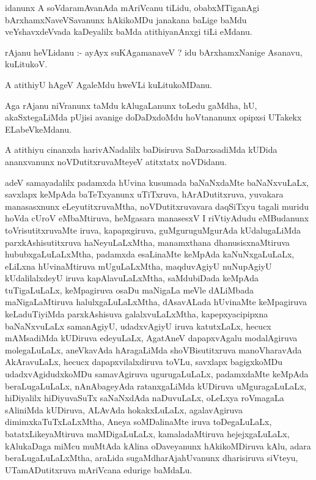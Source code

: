 \documentclass{article}
\begin{document}
\begin{mn}
idanunx  A  soVdaramAvanAda  mAriVcanu  tiLidu,  obabxMTiganAgi  bArxhamxNaveVSavanunx  hAkikoMDu  janakana  baLige  baMdu  veYshavxdeVvada  
kaDeyalilx  baMda  atithiyanAnxgi  tiLi  eMdanu.
\end{mn}

\begin{mn}
rAjanu  heVLidanu :- ayAyx  suKAgamanaveV ?  idu  bArxhamxNanige  Asanavu,  kuLitukoV.
\end{mn}

\begin{mn}
A  atithiyU  hAgeV  AgaleMdu  hweVLi  kuLitukoMDanu.
\end{mn}

\begin{mn}
Aga  rAjanu  niVranunx  taMdu  kAlugaLanunx  toLedu  gaMdha,  hU,  akaSxtegaLiMda  pUjisi  avanige  doDaDxdoMdu  hoVtananunx  
opipxsi  UTakekx  ELabeVkeMdanu.
\end{mn}

\begin{mn}
A  atithiyu  cinanxda  harivANadalilx  baDisiruva  SaDarxsadiMda  kUDida  ananxvanunx  noVDutitxruvaMteyeV  atitxtatx  noVDidanu.  
\end{mn}

\begin{mn}
adeV  samayadalilx  padamxda  hUvina  kusumada  baNaNxdaMte  baNaNxvuLaLx,  savxlapx  keMpAda  baTeTxyanunx  uTiTxruva,  hArADutitxruva,  
yuvakara  manasasxnunx  eLeyutitxruvaMtha,  noVDutitxruvavara  daqSiTxyu  tagali  muridu  hoVda  cUroV  eMbaMtiruva,  heMgasara  manasesxV  
I  riVtiyAdudu  eMBudanunx  toVrisutitxruvaMte  iruva,  kapapxgiruva,  guMguruguMgurAda  kUdalugaLiMda  parxkAshisutitxruva  haNeyuLaLxMtha,  
manamxthana  dhanusisxnaMtiruva  hububxgaLuLaLxMtha,  padamxda  esaLinaMte  keMpAda  kaNuNxgaLuLaLx,  eLiLxna  hUvinaMtiruva  mUguLaLxMtha,  
maqduvAgiyU  nuNupAgiyU  kUdalilalxdeyU  iruva  kapAlavuLaLxMtha,  saMdubiDada  keMpAda  tuTigaLuLaLx,  keMpagiruva  osaDu  maNigaLa  meVle  
dALiMbada  maNigaLaMtiruva  halulxgaLuLaLxMtha,  dAsavALada  hUvinaMte  keMpagiruva  keLaduTiyiMda  parxkAshisuva  galalxvuLaLxMtha,  
kapepxyacipipxna  baNaNxvuLaLx  samanAgiyU,  udadxvAgiyU  iruva  katutxLaLx,  hecucx  mAMsadiMda  kUDiruva  edeyuLaLx,  AgatAneV  dapapxvAgalu  
modalAgiruva  molegaLuLaLx,  aneVkavAda  hAragaLiMda  shoVBisutitxruva  manoVharavAda  AkAravuLaLx,  hecucx  dapapxvilalxdiruva  toVLu,  savxlapx  
bagigxkoMDu  udadxvAgidudxkoMDu  samavAgiruva  ugurugaLuLaLx,  padamxdaMte  keMpAda  beraLugaLuLaLx,  nAnAbageyAda  ratanxgaLiMda  kUDiruva  
uMguragaLuLaLx,  hiDiyalilx  hiDiyuvaSuTx  saNaNxdAda  naDuvuLaLx,  oLeLxya  roVmagaLa  sAliniMda  kUDiruva,  ALAvAda  hokakxLuLaLx,  agalavAgiruva  
dimimxkaTuTxLaLxMtha,  Aneya  soMDalinaMte  iruva  toDegaLuLaLx,  batatxLikeyaMtiruva  maMDigaLuLaLx,  kamaladaMtiruva  hejejxgaLuLaLx,  kAlukaDaga  
miMcu  muMtAda  kAlina  oDaveyanunx  hAkikoMDiruva  kAlu,  adara  beraLugaLuLaLxMtha,  araLida  sugaMdharAjahUvanunx  dharisiruva  siVteyu,  
UTamADutitxruva  mAriVcana  edurige  baMdaLu.
\end{mn}
\end{document}
